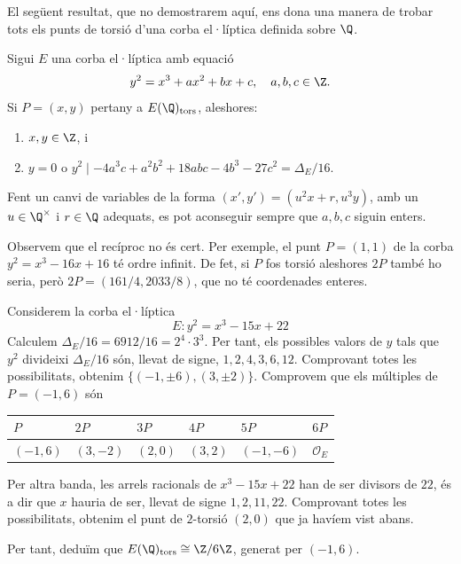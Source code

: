  El següent resultat, que no demostrarem aquí, ens dona una manera de trobar tots els punts de torsió d'una corba el·líptica definida sobre $\Q$.
 \begin{theorem}
 Sigui $E$ una corba el·líptica amb equació
 \[
 y^2=x^3+ax^2+bx+c,\quad a,b,c\in\Z.
 \]
 Si $P=(x,y)$ pertany a $E(\Q)_\tors$, aleshores:
 \begin{enumerate}
     \item $x,y\in\Z$, i
     \item $y=0$ o $y^2 \mid -4a^3c+a^2b^2+18abc-4b^3-27c^2=\Delta_E/16$.
 \end{enumerate}
 \end{theorem}
\begin{remark}
Fent un canvi de variables de la forma $(x',y') = (u^2 x +r , u^3 y)$, amb un $u\in\Q^\times$ i $r\in \Q$ adequats,  es pot aconseguir sempre que $a,b,c$ siguin enters.
\end{remark}

\begin{remark}
Observem que el recíproc no és cert. Per exemple, el punt $P=(1,1)$ de la corba $y^2=x^3-16x+16$ té ordre infinit. De fet, si $P$ fos torsió aleshores $2P$ també ho seria, però $2P=(161/4,2033/8)$, que no té coordenades enteres.
\end{remark}
\begin{example}
Considerem la corba el·líptica
\[
E\colon y^2=x^3-15x+22
\]
Calculem $\Delta_E /16= 6912/16 = 2^4\cdot 3^3$. Per tant, els possibles valors de $y$ tals que $y^2$ divideixi $\Delta_E/16$ són, llevat de signe, $1, 2, 4, 3, 6, 12$. Comprovant totes les possibilitats, obtenim $\{(-1,\pm 6), (3,\pm 2)\}$. Comprovem que els múltiples de $P=(-1,6)$ són

\begin{center}
  \begin{tabular}{llllll}
\toprule
     $P$ & $2P$ & $3P$ & $4P$ & $5P$ & $6P$ \\
\midrule
$(-1,6)$&$(3,-2)$&$(2,0)$&$(3,2)$&$(-1,-6)$&$\mathcal{O}_E$\\
\bottomrule
\end{tabular}
\end{center}

Per altra banda, les arrels racionals de $x^3-15x+22$ han de ser divisors de $22$, és a dir que $x$ hauria de ser, llevat de signe $1,2, 11, 22$. Comprovant totes les possibilitats, obtenim el punt de $2$-torsió $(2, 0)$ que ja havíem vist abans.

Per tant, deduïm que $E(\Q)_\text{tors} \cong \Z/6\Z$, generat per $(-1,6)$.
\end{example}


